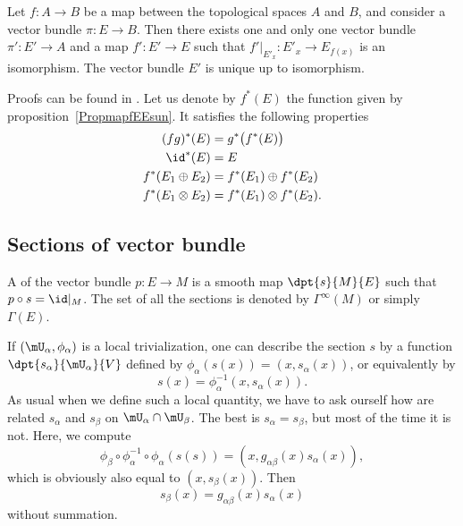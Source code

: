 \begin{proposition}		\label{PropmapfEEsun}
	Let $f\colon A\to B$ be a map between the topological spaces $A$ and $B$, and consider a vector bundle $\pi\colon E\to B$. Then there exists one and only one vector bundle $\pi'\colon E'\to A$ and a map $f'\colon E'\to E$ such that $f'|_{E'_x}\colon E'_x\to E_{f(x)}$ is an isomorphism. The vector bundle $E'$ is unique up to isomorphism.
\end{proposition}
Proofs can be found in \cite{VB_and_K}. Let us denote by $f^*(E)$ the function given by proposition~\ref{PropmapfEEsun}. It satisfies the following properties
\begin{equation}		\label{EqPropfstarEVect}
	\begin{split}
		(fg)^*(E)		&=g^*\big( f^*(E) \big)\\
		\id^*(E)		&=E\\
		f^*(E_1\oplus E_2)	&=f^*(E_1)\oplus f^*(E_2)\\
		f^*(E_1\otimes E_2)	&=f^*(E_1)\otimes f^*(E_2).
	\end{split}
\end{equation}



\subsection{Sections of vector bundle}

A  of the vector bundle $p\colon E\to M$ is a smooth map $\dpt{s}{M}{E}$ such that $p\circ s=\id|_M$. The set of all the sections is denoted by $\Gamma^{\infty}(M)$ or simply $\Gamma(E)$.

If $(\mU_{\alpha},\phi_{\alpha})$ is a local trivialization, one can describe the section $s$ by a function $\dpt{s_{\alpha}}{\mU_{\alpha}}{V}$ defined by $\phi_{\alpha}(s(x))=(x,s_{\alpha}(x))$, or equivalently by
\[
	s(x)=\phi_{\alpha}^{-1}(x,s_{\alpha}(x)).
\]
As usual when we define such a local quantity, we have to ask ourself how are related $s_{\alpha}$ and $s_{\beta}$ on $\mU_{\alpha}\cap\mU_{\beta}$. The best is $s_{\alpha}=s_{\beta}$, but most of the time it is not. Here, we compute
\[
	\phi_{\beta}\circ\phi_{\alpha}^{-1}\circ\phi_{\alpha}(s(s))=(x,g_{\alpha\beta}(x)s_{\alpha}(x)),
\]
which is obviously also equal to $(x,s_{\beta}(x))$. Then
\begin{equation}\label{eq:tr_sec}
	s_{\beta}(x)=g_{\alpha\beta}(x)s_{\alpha}(x)
\end{equation}
without summation.

